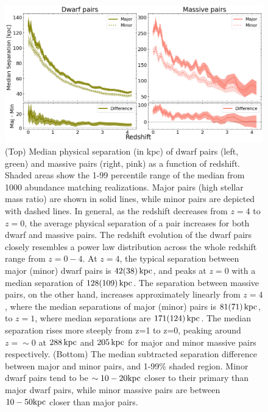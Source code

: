 \documentclass[twocolumn]{aastex631}
\begin{document}
\begin{figure}[htp]
  \centering
  \includegraphics[width=\textwidth]{separation_1000.png}
  \caption{(Top) Median physical separation (in kpc) of dwarf pairs (left, green) and massive pairs (right, pink) as a function of redshift. 
  Shaded areas show the 1-99 percentile range of the median from 1000 abundance matching realizations. 
  Major pairs (high stellar mass ratio) are shown in solid lines, while minor pairs are depicted with dashed lines.
  In general, as the redshift decreases from $z=4$ to $z=0$, the average physical separation of a pair increases for both dwarf and massive pairs. 
  The redshift evolution of the dwarf pairs closely resembles a power law distribution across the whole redshift range from $z=0-4$.
  At $z=4$, the typical separation between major (minor) dwarf pairs is $42(38)\,\mathrm{kpc}$, and peaks at $z=0$ with a median separation of $128(109)\,\mathrm{kpc}$.
  The separation between massive pairs, on the other hand, increases approximately linearly from $z=4$, where the median separations of major (minor) pairs is $81(71)\,\mathrm{kpc}$, to $z=1$, where median separations are $171(124)\,\mathrm{kpc}$. The median separation rises more steeply from z=1 to z=0, peaking around $z=\sim0$ at $288\,\mathrm{kpc}$ and $205\,\mathrm{kpc}$ for major and minor massive pairs respectively.
  (Bottom) The median subtracted separation difference between major and minor pairs, and 1-99\% shaded region.
  Minor dwarf pairs tend to be $\sim10-20\mathrm{kpc}$ closer to their primary than major dwarf pairs, while minor massive pairs are between $10-50\mathrm{kpc}$ closer than major pairs. 
    }
  \label{fig:sep}
\end{figure}
\end{document}
